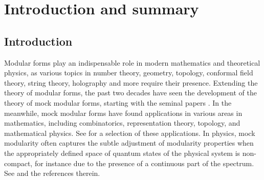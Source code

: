 \documentclass[pdftex]{sigma}
\theoremstyle{definition}
\numberwithin{equation}{section}
\begin{document}


\vspace{-2mm}

\section{Introduction and summary}
\label{sec:intro_sum}
\subsection{Introduction}

Modular forms play an indispensable role in modern mathematics and theoretical physics, as various topics in number theory, geometry, topology, conformal field theory, string theory, holography and more require their presence. Extending the theory of modular forms, the past two decades have seen the development of the theory of mock modular forms, starting with the seminal papers \cite{ BringmannOno,2002math12286H, ZagierBourbaki,zwegers2008mock}. In the meanwhile, mock modular forms have found applications in various areas in mathematics, including combinatorics, representation theory, topology, and mathematical physics. See \cite{Bringmann2017HarmonicMF} for a selection of these applications. In physics, mock modularity often captures the subtle adjustment of modularity properties when the appropriately defined space of quantum states of the physical system is non-compact, for instance due to the presence of a continuous part of the spectrum. See \cite{Dabholkar:2021lzt} and the references therein.
\end{document}
